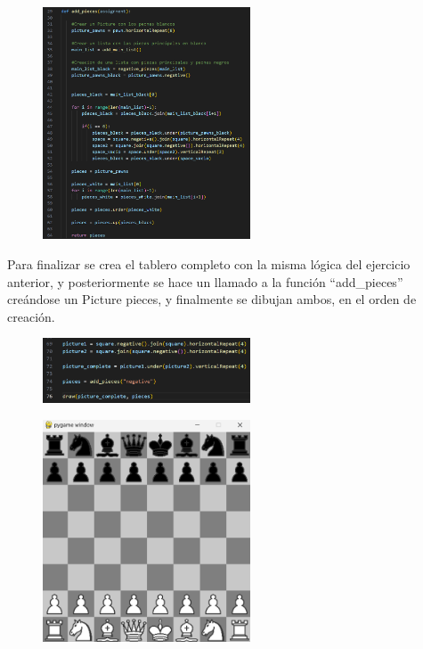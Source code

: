 \documentclass{article}
\begin{document}
	
	\begin{figure}[H]
		\centering
		\includegraphics[width=0.55\textwidth,keepaspectratio]{img/cap16_2.png}
	\end{figure}
	
	Para finalizar se crea el tablero completo con la misma lógica del ejercicio anterior, y posteriormente se hace un llamado a la función “add\_pieces” creándose un Picture pieces, y finalmente se dibujan ambos, en el orden de creación.
	
	\begin{figure}[H]
		\centering
		\includegraphics[width=0.55\textwidth,keepaspectratio]{img/cap16_3.png}
	\end{figure}
	
	\begin{figure}[H]
		\centering
		\includegraphics[width=0.55\textwidth,keepaspectratio]{img/Picture G.png}
	\end{figure}
	
\end{document}

